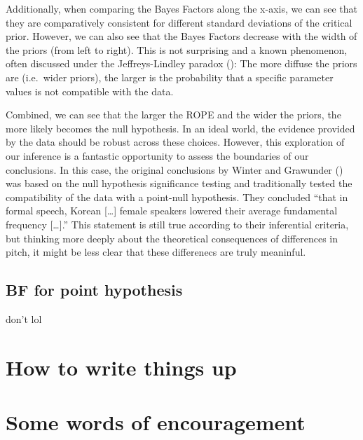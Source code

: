 \documentclass[
  doc,
  floatsintext,
  longtable,
  nolmodern,
  notxfonts,
  notimes,
  colorlinks=true,linkcolor=blue,citecolor=blue,urlcolor=blue]{apa7}
\begin{document}
Additionally, when comparing the Bayes Factors along the x-axis, we can
see that they are comparatively consistent for different standard
deviations of the critical prior. However, we can also see that the
Bayes Factors decrease with the width of the priors (from left to
right). This is not surprising and a known phenomenon, often discussed
under the Jeffreys-Lindley paradox
():
The more diffuse the priors are (i.e.~wider priors), the larger is the
probability that a specific parameter values is not compatible with the
data.

Combined, we can see that the larger the ROPE and the wider the priors,
the more likely becomes the null hypothesis. In an ideal world, the
evidence provided by the data should be robust across these choices.
However, this exploration of our inference is a fantastic opportunity to
assess the boundaries of our conclusions. In this case, the original
conclusions by Winter and Grawunder
() was
based on the null hypothesis significance testing and traditionally
tested the compatibility of the data with a point-null hypothesis. They
concluded ``that in formal speech, Korean {[}\ldots{]} female speakers
lowered their average fundamental frequency {[}\ldots{]}.'' This
statement is still true according to their inferential criteria, but
thinking more deeply about the theoretical consequences of differences
in pitch, it might be less clear that these differenecs are truly
meaninful.

\subsection{BF for point hypothesis}\label{bf-for-point-hypothesis}

don't lol

\section{How to write things up}\label{how-to-write-things-up}

\section{Some words of encouragement}\label{some-words-of-encouragement}
\end{document}
